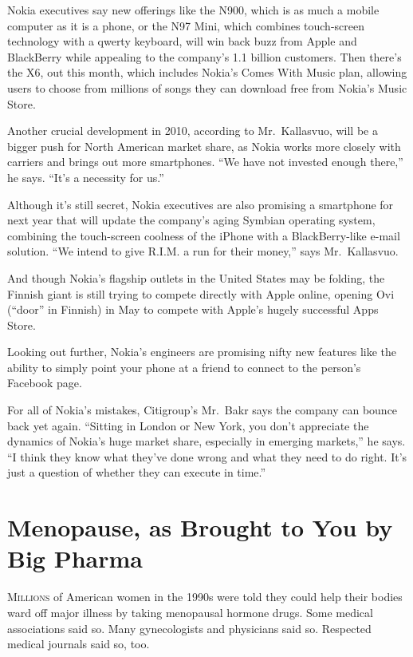 ﻿\documentclass[12pt]{article}
\begin{document}
Nokia executives say new offerings like the N900, which is as much a mobile computer as it is a
phone, or the N97 Mini, which combines touch-screen technology with a qwerty keyboard, will win back
buzz from Apple and BlackBerry while appealing to the company's 1.1 billion customers. Then there's
the X6, out this month, which includes Nokia's Comes With Music plan, allowing users to choose from
millions of songs they can download free from Nokia's Music Store.

Another crucial development in 2010, according to Mr.~Kallasvuo, will be a bigger push for North
American market share, as Nokia works more closely with carriers and brings out more smartphones.
``We have not invested enough there,'' he says. ``It's a necessity for us.''

Although it's still secret, Nokia executives are also promising a smartphone for next year that will
update the company's aging Symbian operating system, combining the touch-screen coolness of the
iPhone with a BlackBerry-like e-mail solution. ``We intend to give R.I.M. a run for their money,''
says Mr.~Kallasvuo.

And though Nokia's flagship outlets in the United States may be folding, the Finnish giant is still
trying to compete directly with Apple online, opening Ovi (``door'' in Finnish) in May to compete
with Apple's hugely successful Apps Store.

Looking out further, Nokia's engineers are promising nifty new features like the ability to simply
point your phone at a friend to connect to the person's Facebook page.

For all of Nokia's mistakes, Citigroup's Mr.~Bakr says the company can bounce back yet again.
``Sitting in London or New York, you don't appreciate the dynamics of Nokia's huge market share,
especially in emerging markets,'' he says. ``I think they know what they've done wrong and what they
need to do right. It's just a question of whether they can execute in time.''

\section{Menopause, as Brought to You by Big Pharma}

\lettrine{M}{illions} of American women in the 1990s were told they could
help their bodies ward off major illness by taking menopausal hormone drugs. Some medical
associations said so. Many gynecologists and physicians said so. Respected medical journals said so,
too.
\end{document}
